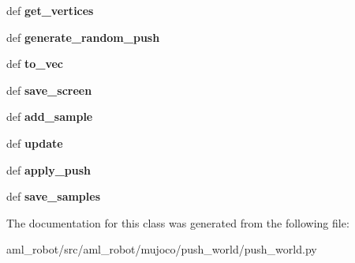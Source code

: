 \begin{DoxyCompactItemize}
\item 
\hypertarget{classaml__robot_1_1mujoco_1_1push__world_1_1push__world_1_1_push_world_aff4c6deab0036ced0abd1225387625c7}{def {\bfseries get\-\_\-vertices}}\label{classaml__robot_1_1mujoco_1_1push__world_1_1push__world_1_1_push_world_aff4c6deab0036ced0abd1225387625c7}

\item 
\hypertarget{classaml__robot_1_1mujoco_1_1push__world_1_1push__world_1_1_push_world_a3e5edb57f47f359d4fcdc2366749672c}{def {\bfseries generate\-\_\-random\-\_\-push}}\label{classaml__robot_1_1mujoco_1_1push__world_1_1push__world_1_1_push_world_a3e5edb57f47f359d4fcdc2366749672c}

\item 
\hypertarget{classaml__robot_1_1mujoco_1_1push__world_1_1push__world_1_1_push_world_a2e86f1aa4ad7400d0547c754d5fc08a5}{def {\bfseries to\-\_\-vec}}\label{classaml__robot_1_1mujoco_1_1push__world_1_1push__world_1_1_push_world_a2e86f1aa4ad7400d0547c754d5fc08a5}

\item 
\hypertarget{classaml__robot_1_1mujoco_1_1push__world_1_1push__world_1_1_push_world_ae0c9366476483c1790178fe2df17fdcd}{def {\bfseries save\-\_\-screen}}\label{classaml__robot_1_1mujoco_1_1push__world_1_1push__world_1_1_push_world_ae0c9366476483c1790178fe2df17fdcd}

\item 
\hypertarget{classaml__robot_1_1mujoco_1_1push__world_1_1push__world_1_1_push_world_a4f7e15b577cea0cc9ac7f9154799905d}{def {\bfseries add\-\_\-sample}}\label{classaml__robot_1_1mujoco_1_1push__world_1_1push__world_1_1_push_world_a4f7e15b577cea0cc9ac7f9154799905d}

\item 
\hypertarget{classaml__robot_1_1mujoco_1_1push__world_1_1push__world_1_1_push_world_a111aa16013d468719a5c75687543ef99}{def {\bfseries update}}\label{classaml__robot_1_1mujoco_1_1push__world_1_1push__world_1_1_push_world_a111aa16013d468719a5c75687543ef99}

\item 
\hypertarget{classaml__robot_1_1mujoco_1_1push__world_1_1push__world_1_1_push_world_a25b3a42c65c9dd562cba13433ca65f49}{def {\bfseries apply\-\_\-push}}\label{classaml__robot_1_1mujoco_1_1push__world_1_1push__world_1_1_push_world_a25b3a42c65c9dd562cba13433ca65f49}

\item 
\hypertarget{classaml__robot_1_1mujoco_1_1push__world_1_1push__world_1_1_push_world_ade701bd5fb292d1f597c6452dd7d1696}{def {\bfseries save\-\_\-samples}}\label{classaml__robot_1_1mujoco_1_1push__world_1_1push__world_1_1_push_world_ade701bd5fb292d1f597c6452dd7d1696}

\end{DoxyCompactItemize}


The documentation for this class was generated from the following file\-:\begin{DoxyCompactItemize}
\item 
aml\-\_\-robot/src/aml\-\_\-robot/mujoco/push\-\_\-world/push\-\_\-world.\-py\end{DoxyCompactItemize}

